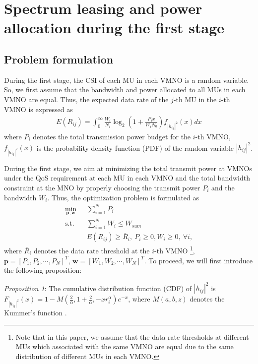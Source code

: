 \documentclass[journal]{IEEEtran}
\begin{document}
\section{Spectrum leasing and power allocation during the first stage}

\subsection{Problem formulation}
During the first stage, the CSI of each MU in each VMNO is a random variable. So, we first assume that the bandwidth and power allocated to all MUs in each VMNO are equal. Thus, the expected data rate of the $j$-th MU in the $i$-th VMNO is expressed as
\begin{align}
E\left({R}_{ij}\right) = \int_{0}^{\infty} \frac{W_i}{N_i} \log_2\left(1 + \frac{P_i x}{W_i N_0}\right) f_{\left|h_{ij} \right|^2} \left(x\right)dx
\end{align}
where $P_i$ denotes the total transmission power budget for the $i$-th VMNO, $f_{\left|h_{ij} \right|^2} \left(x\right)$ is the probability density function (PDF) of the random variable $\left|h_{ij} \right|^2$. 

During the first stage, we aim at minimizing the total transmit power at VMNOs under the QoS requirement at each MU in each VMNO and the total bandwidth constraint at the MNO by properly choosing the transmit power $P_i$ and the bandwidth $W_i$. Thus, the optimization problem is formulated as
\begin{subequations}\label{q4}
	\begin{align}
	\min_{\mathbf{p}, \mathbf{w}}\ & \sum\limits_{i = 1}^{N} P_i \\ \mbox{s.t.} \quad &  \sum\limits_{i = 1}^{N} W_i \leq W_{sum}\\ \quad &  E\left({R}_{ij}\right) \geq \bar{R}_i, \ P_i \geq 0, W_i \geq 0, \ \forall i, 
	\end{align}
\end{subequations}
where $\bar{R}_i$ denotes the data rate threshold at the $i$-th VMNO  \footnote{Note that in this paper, we assume that the data rate thresholds at different MUs which associated with the same VMNO are equal due to the same distribution of different MUs in each VMNO.}, $\mathbf{p} = \left[P_1, P_2, \cdots, P_N\right]^T$, $\mathbf{w} = \left[W_1, W_2, \cdots, W_N\right]^T$. To proceed, we will first introduce the following proposition:

\textit{Proposition 1}: The cumulative distribution function (CDF) of $\left|h_{ij} \right|^2$ is $F_{\left|h_{ij} \right|^2}\left(x\right) = 1 - M\left(\frac{2}{\alpha}, 1 + \frac{2}{\alpha}, - x r_i^{\alpha}\right)e^{-x}$, where $M\left(a,b,z\right)$ denotes the Kummer's function \cite{MAbramowitz}.
\end{document}
